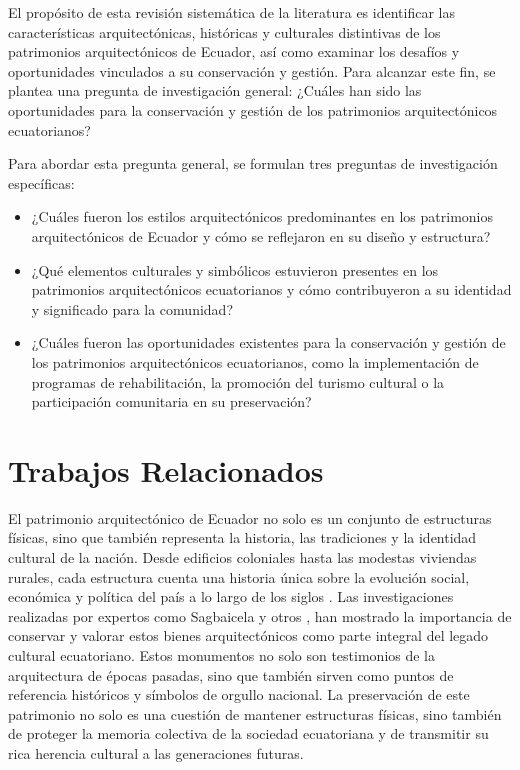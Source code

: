 \documentclass[journal,article,submit,pdftex,moreauthors]{Definitions/mdpi}
\begin{document}
El propósito de esta revisión sistemática de la literatura es identificar las características arquitectónicas, históricas y culturales distintivas de los patrimonios arquitectónicos de Ecuador, así como examinar los desafíos y oportunidades vinculados a su conservación y gestión. Para alcanzar este fin, se plantea una pregunta de investigación general: ¿Cuáles han sido las oportunidades para la conservación y gestión de los patrimonios arquitectónicos ecuatorianos?
\par %
Para abordar esta pregunta general, se formulan tres preguntas de investigación específicas: 
\begin{itemize}
\item ¿Cuáles fueron los estilos arquitectónicos predominantes en los patrimonios arquitectónicos de Ecuador y cómo se reflejaron en su diseño y estructura?
\item ¿Qué elementos culturales y simbólicos estuvieron presentes en los patrimonios arquitectónicos ecuatorianos y cómo contribuyeron a su identidad y significado para la comunidad?
\item ¿Cuáles fueron las oportunidades existentes para la conservación y gestión de los patrimonios arquitectónicos ecuatorianos, como la implementación de programas de rehabilitación, la promoción del turismo cultural o la participación comunitaria en su preservación?
\end{itemize}

\section{Trabajos Relacionados}
El patrimonio arquitectónico de Ecuador no solo es un conjunto de estructuras físicas, sino que también representa la historia, las tradiciones y la identidad cultural de la nación. Desde edificios coloniales hasta las modestas viviendas rurales, cada estructura cuenta una historia única sobre la evolución social, económica y política del país a lo largo de los siglos \cite{art:articulo9}. Las investigaciones realizadas por expertos como Sagbaicela y otros \cite{art:articulo10}, han mostrado la importancia de conservar y valorar estos bienes arquitectónicos como parte integral del legado cultural ecuatoriano. Estos monumentos no solo son testimonios de la arquitectura de épocas pasadas, sino que también sirven como puntos de referencia históricos y símbolos de orgullo nacional. La preservación de este patrimonio no solo es una cuestión de mantener estructuras físicas, sino también de proteger la memoria colectiva de la sociedad ecuatoriana y de transmitir su rica herencia cultural a las generaciones futuras. 
\end{document}
